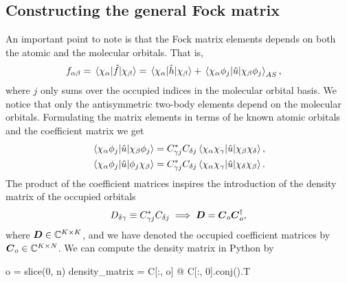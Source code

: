         \subsection{Constructing the general Fock matrix}
            An important point to note is that the Fock matrix elements depends
            on both the atomic and the molecular orbitals.
            That is,
            \begin{align}
                f_{\alpha\beta}
                &= \mel*{\chi_{\alpha}}{\hat{f}}{\chi_{\beta}}
                = \mel*{\chi_{\alpha}}{\hat{h}}{\chi_{\beta}}
                +
                \mel*{\chi_{\alpha}\phi_j}{\hat{u}}{\chi_{\beta}\phi_j}_{AS},
            \end{align}
            where $j$ only sums over the occupied indices in the molecular
            orbital basis.
            We notice that only the antisymmetric two-body elements depend on
            the molecular orbitals.
            Formulating the matrix elements in terms of he known atomic orbitals
            and the coefficient matrix we get
            \begin{align}
                \mel*{\chi_{\alpha}\phi_j}{\hat{u}}{\chi_{\beta}\phi_j}
                &=
                C^{*}_{\gamma j} C_{\delta j}
                \mel*{\chi_{\alpha}\chi_{\gamma}}{\hat{u}}{\chi_{\beta}\chi_{\delta}},
                \\
                \mel*{\chi_{\alpha}\phi_j}{\hat{u}}{\phi_j\chi_{\beta}}
                &=
                C^{*}_{\gamma j} C_{\delta j}
                \mel*{\chi_{\alpha}\chi_{\gamma}}{\hat{u}}{\chi_{\delta}\chi_{\beta}}.
            \end{align}
            The product of the coefficient matrices inspires the introduction of
            the density matrix of the occupied orbitals
            \begin{align}
                D_{\delta\gamma} \equiv
                C^{*}_{\gamma j} C_{\delta j}
                \implies
                \boldsymbol{D} = \boldsymbol{C}_{o}\boldsymbol{C}^{\dagger}_{o},
                \label{eq:ghf-density-matrix}
            \end{align}
            where $\boldsymbol{D} \in \mathbb{C}^{K \times K}$, and we have denoted the
            occupied coefficient matrices by $\boldsymbol{C}_o \in \mathbb{C}^{K \times
            N}$.
            We can compute the density matrix in Python by
            \begin{python}
o = slice(0, n)
density_matrix = C[:, o] @ C[:, 0].conj().T
            \end{python}
